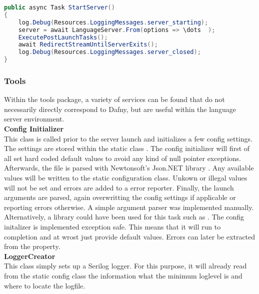 \begin{lstlisting}[language=csharp, caption={Starting the Language Server}, captionpos=b, label={lst:serverstart}]
public async Task StartServer()
{
    log.Debug(Resources.LoggingMessages.server_starting);
    server = await LanguageServer.From(options => \dots  );
    ExecutePostLaunchTasks();
    await RedirectStreamUntilServerExits();
    log.Debug(Resources.LoggingMessages.server_closed);
}
\end{lstlisting}

\subsubsection{Tools}
Within the tools package, a variety of services can be found that do not necessarily directly correspond to Dafny, but are useful within the language server environment.\\

\textbf{Config Initializer}\\
This class is called prior to the server launch and initializes a few config settings. The settings are stored within the static class . The config initializer will first of all set hard coded default values to avoid any kind of null pointer exceptions. Afterwards, the file  is parsed with Newtonsoft's Json.NET library \cite{jsondotnet}. Any available values will be written to the static configuration class. Unkown or illegal values will not be set and errors are added to a error reporter. Finally, the launch arguments are parsed, again overwritting the config settings if applicable or reporting errors otherwise. A simple argument parser was implemented manually. Alternatively, a library could have been used for this task such as \cite{clparser}. The config initalizer is implemented exception safe. This means that it will run to completion and at wrost just provide default values. Errors can later be extracted from the  property.\\

\textbf{LoggerCreator}\\
This class simply sets up a Serilog \cite{serilog} logger. For this purpose, it will already read from the static config class  the information what the minimum loglevel is and where to locate the logfile.\\

